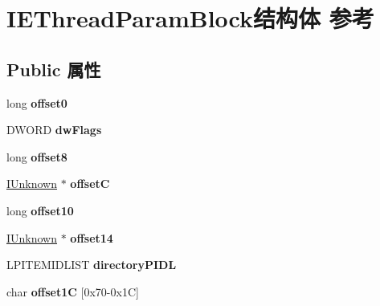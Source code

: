 \hypertarget{struct_i_e_thread_param_block}{}\section{I\+E\+Thread\+Param\+Block结构体 参考}
\label{struct_i_e_thread_param_block}
\subsection*{Public 属性}
\begin{DoxyCompactItemize}
\item 
\mbox{\label{struct_i_e_thread_param_block_a08f262f33bc76b1c36659ffdaf915b30}} 
long {\bfseries offset0}
\item 
\mbox{\label{struct_i_e_thread_param_block_a58e5f3a4f1af75123802788ae720c121}} 
D\+W\+O\+RD {\bfseries dw\+Flags}
\item 
\mbox{\label{struct_i_e_thread_param_block_af51be172ff773c65b4db03bd1ba4ff3c}} 
long {\bfseries offset8}
\item 
\mbox{\label{struct_i_e_thread_param_block_a78ffb750614f0e0a0f1c18cd531e9a05}} 
\hyperlink{interface_i_unknown}{I\+Unknown} $\ast$ {\bfseries offsetC}
\item 
\mbox{\label{struct_i_e_thread_param_block_a4b33d31f9692f89281456b660a03fa94}} 
long {\bfseries offset10}
\item 
\mbox{\label{struct_i_e_thread_param_block_a6917b6cf38ac423b584cf86456a65150}} 
\hyperlink{interface_i_unknown}{I\+Unknown} $\ast$ {\bfseries offset14}
\item 
\mbox{\label{struct_i_e_thread_param_block_ac8c562620480885154bfff480047e957}} 
L\+P\+I\+T\+E\+M\+I\+D\+L\+I\+ST {\bfseries directory\+P\+I\+DL}
\item 
\mbox{\label{struct_i_e_thread_param_block_ac9ca146d4f1d1e0335f8c139c5fa4d27}} 
char {\bfseries offset1C} \mbox{[}0x70-\/0x1\+C\mbox{]}

\end{DoxyCompactItemize}
